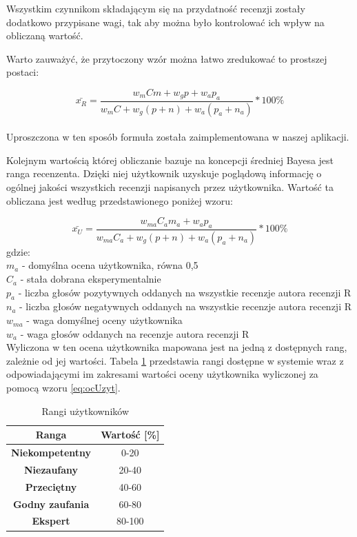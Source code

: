 Wszystkim czynnikom składającym się na przydatność recenzji zostały dodatkowo przypisane wagi, tak aby można było kontrolować ich wpływ na obliczaną wartość.

Warto zauważyć, że przytoczony wzór można łatwo zredukować to prostszej postaci:

\begin{equation}\label{eq:przydatnosc}
\bar{x_{R}}=\frac{w_{m}Cm+w_{g}{p}+w_{a}p_{a}}{w_{m}C+w_{g}(p+n)+w_{a}(p_{a}+n_{a})}*100\%
\end{equation}\\

Uproszczona w ten sposób formuła została zaimplementowana w naszej aplikacji.

Kolejnym wartością której obliczanie bazuje na koncepcji średniej Bayesa jest ranga recenzenta. Dzięki niej użytkownik uzyskuje poglądową informację o ogólnej jakości wszystkich recenzji napisanych przez użytkownika. Wartość ta obliczana jest według przedstawionego poniżej wzoru:

\begin{equation}\label{eq:ocUzyt}
\bar{x_{U}}=\frac{w_{ma}C_{a}m_{a}+w_{a}p_{a}}{w_{ma}C_{a}+w_{g}(p+n)+w_{a}(p_{a}+n_{a})}*100\%
\end{equation}
gdzie:\\
$m_{a}$ - domyślna ocena użytkownika, równa 0,5\\
$C_{a}$ - stała dobrana eksperymentalnie\\
$p_{a}$ - liczba głosów pozytywnych oddanych na wszystkie recenzje autora recenzji R\\
$n_{a}$ - liczba głosów negatywnych oddanych na wszystkie recenzje autora recenzji R\\
$w_{ma}$ - waga domyślnej oceny użytkownika\\
$w_{a}$ - waga głosów oddanych na recenzje autora recenzji R\\

Wyliczona w ten ocena użytkownika mapowana jest na jedną z dostępnych rang, zależnie od jej wartości. Tabela \ref{tab:rangi} przedstawia rangi dostępne w systemie wraz z odpowiadającymi im zakresami wartości oceny użytkownika wyliczonej za pomocą wzoru \ref{eq:ocUzyt}.

\begin{table}[H]
\centering
\begin{tabular}{|c||c|}  
\hline
\textbf{Ranga} & \textbf{Wartość [\%]} \\
\hline\hline
\textbf{Niekompetentny} & 0-20 \\  
\hline
\textbf{Niezaufany} & 20-40 \\  
\hline
\textbf{Przeciętny} & 40-60 \\  
\hline
\textbf{Godny zaufania} & 60-80 \\  
\hline
\textbf{Ekspert} & 80-100 \\  
\hline
\end{tabular}
\caption{Rangi użytkowników}\label{tab:rangi}
\end{table}


